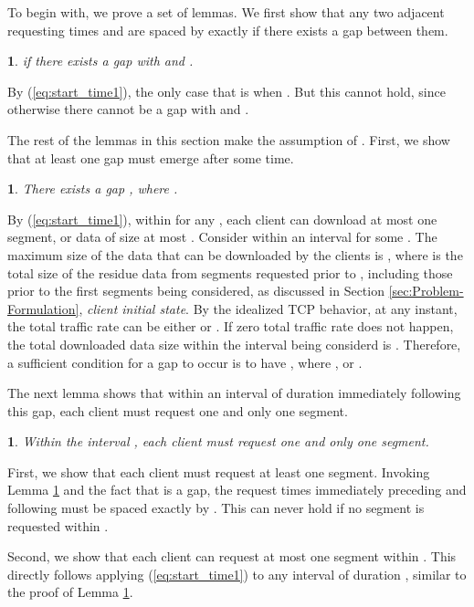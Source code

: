 \documentclass[conference]{IEEEtran}
\theoremstyle{plain}
\theoremstyle{definition}
\theoremstyle{plain}
\newtheorem{lem}[thm]{\protect\lemmaname}
\theoremstyle{plain}
\providecommand{\lemmaname}{Lemma}
\begin{document}
To begin with, we prove a set of lemmas. We first show that any two
adjacent requesting times  and  are spaced
by exactly  if there exists a gap between them.
\begin{lem}
\label{lem:offinterval1} if there exists
a gap  with  and . \end{lem}
\begin{IEEEproof}
By (\ref{eq:start_time1}), the only case that 
is when . But this cannot hold, since otherwise
there cannot be a gap  with 
and .
\end{IEEEproof}
The rest of the lemmas in this section make the assumption of .
First, we show that at least one gap must emerge after some time.
\begin{lem}
\label{lem:undersubscribed1}There exists a gap ,
where .\end{lem}
\begin{IEEEproof}
By (\ref{eq:start_time1}), within  for any , each
client can download at most one segment, or data of size at most .
Consider within an interval 
for some . The maximum size of the data that can
be downloaded by the  clients is ,
where  is the total size of the residue data from segments
requested prior to , including those prior to the
first segments being considered, as discussed in Section \ref{sec:Problem-Formulation},
\emph{client initial state}. By the idealized TCP behavior, at any
instant, the total traffic rate can be either  or . If zero
total traffic rate does not happen, the total downloaded data size
within the interval being considerd is . Therefore, a sufficient
condition for a gap  to occur is to have ,
where , or .
\end{IEEEproof}
The next lemma shows that within an interval of duration  immediately
following this gap, each client must request one and only one segment.
\begin{lem}
Within the interval , each client must request
one and only one segment.\end{lem}
\begin{IEEEproof}
First, we show that each client must request at least one segment.
Invoking Lemma \ref{lem:offinterval1} and the fact that 
is a gap, the request times immediately preceding and following 
must be spaced exactly by . This can never hold if no segment
is requested within . 

Second, we show that each client can request at most one segment within
. This directly follows applying (\ref{eq:start_time1})
to any interval of duration , similar to the proof of Lemma
\ref{lem:undersubscribed1}. 
\end{IEEEproof}
\end{document}
